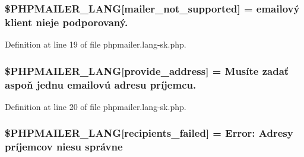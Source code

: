 \subsubsection[{\texorpdfstring{\$\+P\+H\+P\+M\+A\+I\+L\+E\+R\+\_\+\+L\+A\+NG}{$PHPMAILER_LANG}}]{\setlength{\rightskip}{0pt plus 5cm}\$P\+H\+P\+M\+A\+I\+L\+E\+R\+\_\+\+L\+A\+NG\mbox{[}\textquotesingle{}mailer\+\_\+not\+\_\+supported\textquotesingle{}\mbox{]} = \textquotesingle{} emailový klient nieje podporovaný.\textquotesingle{}}\hypertarget{phpmailer_8lang-sk_8php_aa2ebcb8833ee83a7ad67401c4bb3a6ad}{}\label{phpmailer_8lang-sk_8php_aa2ebcb8833ee83a7ad67401c4bb3a6ad}


Definition at line 19 of file phpmailer.\+lang-\/sk.\+php.

\subsubsection[{\texorpdfstring{\$\+P\+H\+P\+M\+A\+I\+L\+E\+R\+\_\+\+L\+A\+NG}{$PHPMAILER_LANG}}]{\setlength{\rightskip}{0pt plus 5cm}\$P\+H\+P\+M\+A\+I\+L\+E\+R\+\_\+\+L\+A\+NG\mbox{[}\textquotesingle{}provide\+\_\+address\textquotesingle{}\mbox{]} = \textquotesingle{}Musíte zadať aspoň jednu emailovú adresu príjemcu.\textquotesingle{}}\hypertarget{phpmailer_8lang-sk_8php_a8b97897c2406b7392b056f375feeefbb}{}\label{phpmailer_8lang-sk_8php_a8b97897c2406b7392b056f375feeefbb}


Definition at line 20 of file phpmailer.\+lang-\/sk.\+php.

\subsubsection[{\texorpdfstring{\$\+P\+H\+P\+M\+A\+I\+L\+E\+R\+\_\+\+L\+A\+NG}{$PHPMAILER_LANG}}]{\setlength{\rightskip}{0pt plus 5cm}\$P\+H\+P\+M\+A\+I\+L\+E\+R\+\_\+\+L\+A\+NG\mbox{[}\textquotesingle{}recipients\+\_\+failed\textquotesingle{}\mbox{]} =  Error\+: Adresy príjemcov niesu správne \textquotesingle{}}\hypertarget{phpmailer_8lang-sk_8php_a7589d30bb9b368327c2df015f3e6bcba}{}\label{phpmailer_8lang-sk_8php_a7589d30bb9b368327c2df015f3e6bcba}


